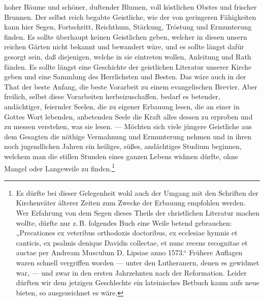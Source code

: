 hoher Bäume und schöner, duftender Blumen, voll köstlichen Obstes und frischer Brunnen. Der selbst reich begabte Geistliche, wie der von geringeren Fähigkeiten kann hier Segen, Fortschritt, Reichthum, Stärkung, Tröstung und Ermunterung finden. Es sollte überhaupt keinen Geistlichen geben, welcher in diesen unsern reichen Gärten nicht bekannt und bewandert wäre, und es sollte längst dafür gesorgt sein, daß diejenigen, welche in sie eintreten wollen, Anleitung und Rath fänden. Es sollte längst eine Geschichte der geistlichen Literatur unserer Kirche geben und eine Sammlung des Herrlichsten und Besten. Das wäre auch in der That der beste Anfang, die beste Vorarbeit zu einem evangelischen Brevier. Aber freilich, selbst diese Vorarbeiten herbeizuschaffen, bedarf es betender, andächtiger, feiernder Seelen, die zu eigener Erbauung lesen, die an einer in Gottes Wort lebenden, anbetenden Seele die Kraft alles dessen zu erproben und zu messen verstehen, was sie lesen. — Möchten sich viele jüngere Geistliche aus dem Gesagten die nöthige Vermahnung und Ermunterung nehmen und in ihren noch jugendlichen Jahren ein heiliges, süßes, andächtiges Studium beginnen, welchem man die stillen Stunden eines ganzen Lebens widmen dürfte, ohne Mangel oder Langeweile zu finden.\footnote{Es dürfte bei dieser Gelegenheit wohl auch der Umgang mit den Schriften der Kirchenväter älterer Zeiten zum Zwecke der Erbauung empfohlen werden. Wer Erfahrung von dem Segen dieses Theils der christlichen Literatur machen wollte, dürfte nur z.\,B. folgendes Buch eine Weile betend gebrauchen: „Precationes ex veteribus orthodoxis doctoribus, ex ecclesiae hymnis et canticis, ex psalmis denique Davidis collectae, et nunc recens recognitae et auctae per Andream Musculum D. Lipsiae anno 1573.“ Frühere Auflagen waren schnell vergriffen worden — unter den Lutheranern, denen es gewidmet war, — und zwar in den ersten Jahrzehnten nach der Reformation. Leider dürften wir dem jetzigen Geschlechte ein lateinisches Betbuch kaum aufs neue bieten, so ausgezeichnet es wäre.}

